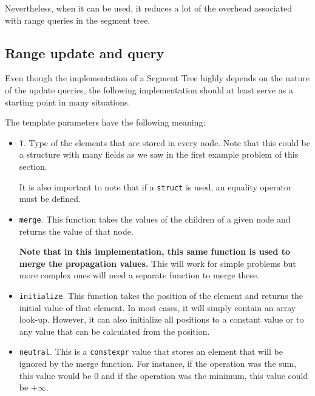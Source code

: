 Nevertheless, when it can be used, it reduces a lot of the overhead
associated with range queries in the segment tree.


\subsection{Range update and query}
Even though the implementation of a Segment Tree highly depends
on the nature of the update queries, the following implementation
should at least serve as a starting point in many situations.

The template parameters have the following meaning:
\begin{itemize}
		\item \texttt{T}. Type of the elements that are stored
				in every node. Note that this could be a structure
				with many fields as we saw in the first example
				problem of this section.

		It is also important to note that if a \texttt{struct} is
		used, an equality operator must be defined.
		\item \texttt{merge}. This function takes the values
				of the children of a given node and returns the
				value of that node.

				\textbf{Note that in this implementation, this same function
				is used to merge the propagation values.} This will work
				for simple problems but more complex ones will need a separate
				function to merge these.
		\item \texttt{initialize}. This function takes the position of
				the element and returns the initial value of that element.
				In most cases, it will simply contain an array look-up. However,
				it can also initialize all positions to a constant value or to
				any value that can be calculated from the position.
		\item \texttt{neutral}. This is a \texttt{constexpr} value that stores
				an element that will be ignored by the merge function. For instance,
				if the operation was the sum, this value would be 0 and if the 
				operation was the minimum, this value could be $+\infty$. 

\end{itemize}










